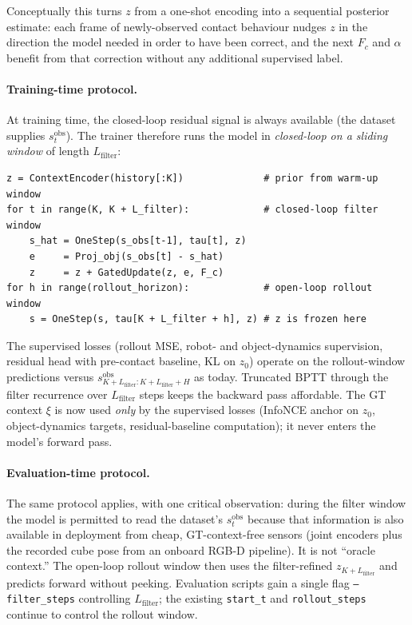 \documentclass[11pt]{article}
\begin{document}
Conceptually this turns $z$ from a one-shot encoding into a sequential
posterior estimate: each frame of newly-observed contact behaviour
nudges $z$ in the direction the model needed in order to have been
correct, and the next $F_c$ and $\alpha$ benefit from that correction
without any additional supervised label.

\paragraph{Training-time protocol.}
At training time, the closed-loop residual signal is always available
(the dataset supplies $s_t^{\mathrm{obs}}$). The trainer therefore
runs the model in \emph{closed-loop on a sliding window} of length
$L_{\mathrm{filter}}$:
\begin{lstlisting}
z = ContextEncoder(history[:K])              # prior from warm-up window
for t in range(K, K + L_filter):             # closed-loop filter window
    s_hat = OneStep(s_obs[t-1], tau[t], z)
    e     = Proj_obj(s_obs[t] - s_hat)
    z     = z + GatedUpdate(z, e, F_c)
for h in range(rollout_horizon):             # open-loop rollout window
    s = OneStep(s, tau[K + L_filter + h], z) # z is frozen here
\end{lstlisting}
The supervised losses (rollout MSE, robot- and object-dynamics
supervision, residual head with pre-contact baseline, KL on $z_0$)
operate on the rollout-window predictions versus
$s^{\mathrm{obs}}_{K+L_{\mathrm{filter}}:K+L_{\mathrm{filter}}+H}$ as
today. Truncated BPTT through the filter recurrence over
$L_{\mathrm{filter}}$ steps keeps the backward pass affordable.
The GT context $\xi$ is now used \emph{only} by the supervised losses
(InfoNCE anchor on $z_0$, object-dynamics targets, residual-baseline
computation); it never enters the model's forward pass.

\paragraph{Evaluation-time protocol.}
The same protocol applies, with one critical observation: during the
filter window the model is permitted to read the dataset's
$s_t^{\mathrm{obs}}$ because that information is also available in
deployment from cheap, GT-context-free sensors (joint encoders plus
the recorded cube pose from an onboard RGB-D pipeline). It is not
``oracle context.'' The open-loop rollout window then uses the
filter-refined $z_{K+L_{\mathrm{filter}}}$ and predicts forward without
peeking. Evaluation scripts gain a single flag
\texttt{--filter\_steps} controlling $L_{\mathrm{filter}}$; the
existing \texttt{start\_t} and \texttt{rollout\_steps} continue to
control the rollout window.
\end{document}
